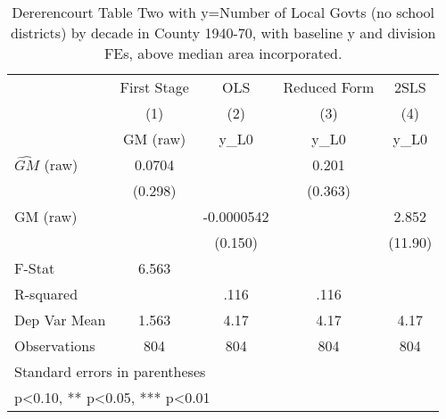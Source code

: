 \begin{table}[htbp]\centering
\def\sym#1{\ifmmode^{#1}\else\(^{#1}\)\fi}
\caption{Dererencourt Table Two with y=Number of Local Govts (no school districts) by decade in County 1940-70, with baseline y and division FEs, above median area incorporated.}
\begin{tabular}{l*{4}{c}}
\toprule
                    & First Stage   &         OLS   &Reduced Form   &        2SLS   \\
                    &\multicolumn{1}{c}{(1)}&\multicolumn{1}{c}{(2)}&\multicolumn{1}{c}{(3)}&\multicolumn{1}{c}{(4)}\\
                    &\multicolumn{1}{c}{GM  (raw)}&\multicolumn{1}{c}{y\_L0}&\multicolumn{1}{c}{y\_L0}&\multicolumn{1}{c}{y\_L0}\\
\midrule
$\hat{GM}$ (raw)    &      0.0704   &               &       0.201   &               \\
                    &     (0.298)   &               &     (0.363)   &               \\
\addlinespace
GM  (raw)           &               &  -0.0000542   &               &       2.852   \\
                    &               &     (0.150)   &               &     (11.90)   \\
\midrule
F-Stat              &       6.563   &               &               &               \\
R-squared           &               &        .116   &        .116   &               \\
Dep Var Mean        &       1.563   &        4.17   &        4.17   &        4.17   \\
Observations        &         804   &         804   &         804   &         804   \\
\bottomrule
\multicolumn{5}{l}{\footnotesize Standard errors in parentheses}\\
\multicolumn{5}{l}{\footnotesize * p<0.10, ** p<0.05, *** p<0.01}\\
\end{tabular}
\end{table}
